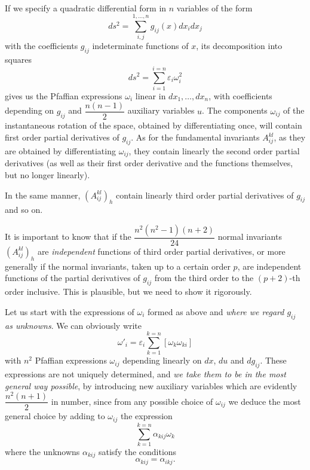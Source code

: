 \documentclass[leqno,12pt]{article}
\makeatletter
\let\old@epsilon\epsilon
\let\old@varepsilon\varepsilon
\let\epsilon\old@varepsilon
\let\varepsilon\old@epsilon
\theoremstyle{shape1}
\theoremstyle{shape0}
\theoremstyle{shape2}
\theoremstyle{definition}
\makeatother
\begin{document}
\paragraph{}
\label{sec:19}
If we specify a quadratic differential form in $n$ variables of the form
\[
ds^{2}=\sum_{i,j}^{1,\dots, n}g_{ij}(x)dx_{i}dx_{j}
\]
with the coefficients $g_{ij}$ indeterminate functions of $x$, its decomposition into squares
\[
ds^{2}=\sum_{i=1}^{i=n}\epsilon_{i}\omega_{i}^{2}
\]
gives us the Pfaffian expressions $\omega_{i}$ linear in $dx_{1},\dots,dx_{n}$, with coefficients depending on $g_{ij}$ and $\dfrac{n(n-1)}{2}$ auxiliary variables $u$. The components $\omega_{ij}$ of the instantaneous rotation of the space, obtained by differentiating once, will contain first order partial derivatives of $g_{ij}$. As for the fundamental invariants $A^{kl}_{ij}$, as they are obtained by differentiating $\omega_{ij}$, they contain linearly the second order partial derivatives (as well as their first order derivative and the functions themselves, but no longer linearly).

In the same manner, $(A^{kl}_{ij})_{h}$ contain linearly third order partial derivatives of $g_{ij}$ and so on.

It is important to know that if the $\dfrac{n^{2}(n^{2}-1)(n+2)}{24}$ normal invariants $(A^{kl}_{ij})_{h}$ are \emph{independent} functions of third order partial derivatives, or more generally if the normal invariants, taken up to a certain order $p$, are independent functions of the partial derivatives of $g_{ij}$ from the third order to the $(p+2)$-th order inclusive. This is plausible, but we need to show it rigorously.

Let us start with the expressions of $\omega_{i}$ formed as above and \emph{where we regard $g_{ij}$ as unknowns}. We can obviously write
\begin{equation}
  \label{eq:32}
  \omega'_{i}=\epsilon_{i}\sum_{k=1}^{k=n}[\omega_{k}\omega_{ki}]
\end{equation}
with $n^{2}$ Pfaffian expressions $\omega_{ij}$ depending linearly on $dx$, $du$ and $dg_{ij}$. These expressions are not uniquely determined, and \emph{we take them to be in the most general way possible}, by introducing new auxiliary variables which are evidently $\dfrac{n^{2}(n+1)}{2}$ in number, since from any possible choice of $\omega_{ij}$ we deduce the most general choice by adding to $\omega_{ij}$ the expression
\[
\sum_{k=1}^{k=n}\alpha_{kij}\omega_{k}
\]
where the unknowns $\alpha_{kij}$ satisfy the conditions
\[
\alpha_{kij}=\alpha_{ikj}.
\]
\end{document}
